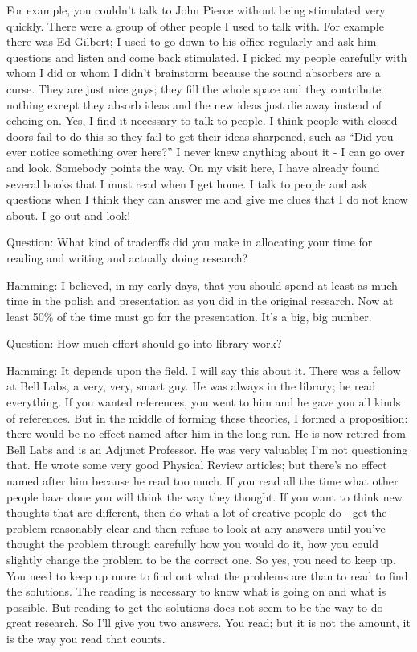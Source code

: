 \documentclass{article}
\begin{document}
For example, you couldn't talk to John Pierce without being stimulated very quickly. There were a group of other people I used to talk with. For example there was Ed Gilbert; I used to go down to his office regularly and ask him questions and listen and come back stimulated. I picked my people carefully with whom I did or whom I didn't brainstorm because the sound absorbers are a curse. They are just nice guys; they fill the whole space and they contribute nothing except they absorb ideas and the new ideas just die away instead of echoing on. Yes, I find it necessary to talk to people. I think people with closed doors fail to do this so they fail to get their ideas sharpened, such as ``Did you ever notice something over here?'' I never knew anything about it - I can go over and look. Somebody points the way. On my visit here, I have already found several books that I must read when I get home. I talk to people and ask questions when I think they can answer me and give me clues that I do not know about. I go out and look!

Question: What kind of tradeoffs did you make in allocating your time for reading and writing and actually doing research?

Hamming: I believed, in my early days, that you should spend at least as much time in the polish and presentation as you did in the original research. Now at least 50\% of the time must go for the presentation. It's a big, big number.

Question: How much effort should go into library work?

Hamming: It depends upon the field. I will say this about it. There was a fellow at Bell Labs, a very, very, smart guy. He was always in the library; he read everything. If you wanted references, you went to him and he gave you all kinds of references. But in the middle of forming these theories, I formed a proposition: there would be no effect named after him in the long run. He is now retired from Bell Labs and is an Adjunct Professor. He was very valuable; I'm not questioning that. He wrote some very good Physical Review articles; but there's no effect named after him because he read too much. If you read all the time what other people have done you will think the way they thought. If you want to think new thoughts that are different, then do what a lot of creative people do - get the problem reasonably clear and then refuse to look at any answers until you've thought the problem through carefully how you would do it, how you could slightly change the problem to be the correct one. So yes, you need to keep up. You need to keep up more to find out what the problems are than to read to find the solutions. The reading is necessary to know what is going on and what is possible. But reading to get the solutions does not seem to be the way to do great research. So I'll give you two answers. You read; but it is not the amount, it is the way you read that counts.
\end{document}
